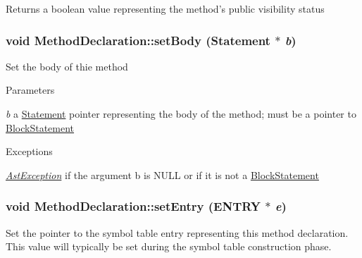 \begin{DoxyReturn}{Returns}
a boolean value representing the method's public visibility status 
\end{DoxyReturn}
\hypertarget{classMethodDeclaration_a0ba428c0491f39c66a6b26d24077b56c}{
\subsubsection[{setBody}]{\setlength{\rightskip}{0pt plus 5cm}void MethodDeclaration::setBody ({\bf Statement} $\ast$ {\em b})}}
\label{classMethodDeclaration_a0ba428c0491f39c66a6b26d24077b56c}
Set the body of thie method


\begin{DoxyParams}{Parameters}
\item[{\em b}]a \hyperlink{classStatement}{Statement} pointer representing the body of the method; must be a pointer to \hyperlink{classBlockStatement}{BlockStatement} \end{DoxyParams}

\begin{DoxyExceptions}{Exceptions}
\item[{\em \hyperlink{classAstException}{AstException}}]if the argument b is NULL or if it is not a \hyperlink{classBlockStatement}{BlockStatement} \end{DoxyExceptions}
\hypertarget{classMethodDeclaration_aa786d4c52123cf501a85f2e3604f7cb6}{
\subsubsection[{setEntry}]{\setlength{\rightskip}{0pt plus 5cm}void MethodDeclaration::setEntry (ENTRY $\ast$ {\em e})}}
\label{classMethodDeclaration_aa786d4c52123cf501a85f2e3604f7cb6}
Set the pointer to the symbol table entry representing this method declaration. This value will typically be set during the symbol table construction phase.


